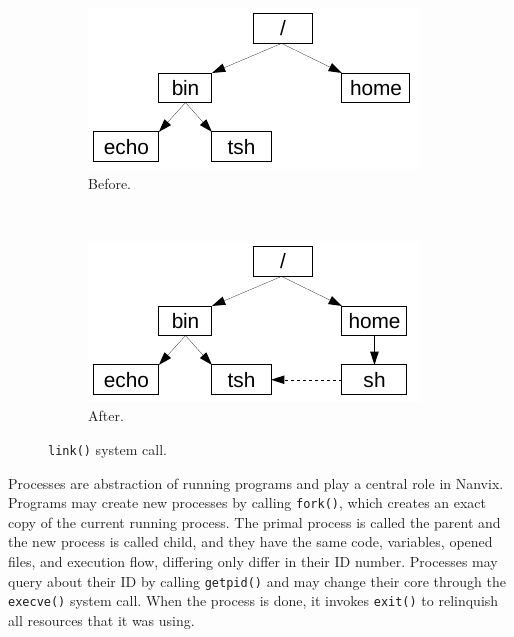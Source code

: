 \documentclass[10pt,a4paper]{article}
\begin{document}
\begin{figure}[b]
	\centering
	\begin{subfigure}[b]{0.35\linewidth}
		\includegraphics[width=\textwidth]{img/link-1}
		\caption{Before.}
	\end{subfigure} ~ 
	\begin{subfigure}[b]{0.35\linewidth}
		\includegraphics[width=\textwidth]{img/link-2}
		\caption{After.}
	\end{subfigure}
	\caption{\texttt{link()} system call.}
	\label{figure: link system call}
\end{figure}

Processes are abstraction of running programs and play a central role in Nanvix. Programs may create new processes by calling \texttt{fork()}, which creates an exact copy of the current running process. The primal process is called the parent and the new process is called child, and they have the same code, variables, opened files, and execution flow, differing only differ in their ID number. Processes may query about their ID by calling \texttt{getpid()} and may change their core through the \texttt{execve()} system call. When the process is done, it invokes \texttt{exit()} to relinquish all resources that it was using.
\end{document}
